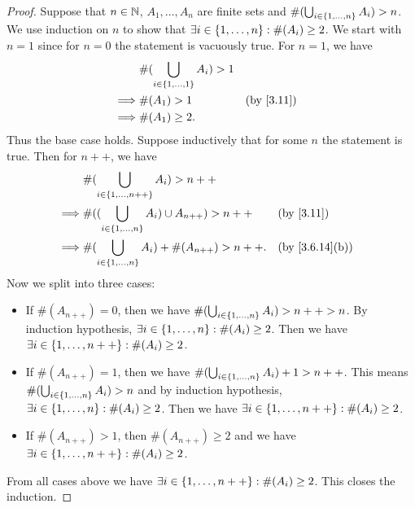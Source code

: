 \begin{proof}
	Suppose that \(n \in \mathbb{N}\), \(A_1, \dots, A_n\) are finite sets and \(\#(\bigcup_{i \in \left\lbrace1, \dots, n\right\rbrace} A_i) > n\).
	We use induction on \(n\) to show that \(\exists i \in \left\lbrace1, \dots, n\right\rbrace : \#(A_i) \geq 2\).
	We start with \(n = 1\) since for \(n = 0\) the statement is vacuously true.
	For \(n = 1\), we have
	\begin{align*}
		         & \#(\bigcup_{i \in \set{1, \dots, 1}} A_i) > 1                \\
		\implies & \#(A_1) > 1                                   &  & \by{3.11} \\
		\implies & \#(A_1) \geq 2.
	\end{align*}
	Thus the base case holds.
	Suppose inductively that for some \(n\) the statement is true.
	Then for \(n++\), we have
	\begin{align*}
		         & \#(\bigcup_{i \in \set{1, \dots, n++}} A_i) > n++                                                \\
		\implies & \#((\bigcup_{i \in \set{1, \dots, n}} A_i) \cup A_{n++}) > n++ &  & \by{3.11}                    \\
		\implies & \#(\bigcup_{i \in \set{1, \dots, n}} A_i) + \#(A_{n++}) > n++. &  & \text{(by \cref{3.6.14}(b))}
	\end{align*}
	Now we split into three cases:
	\begin{itemize}
		\item If \(\#(A_{n++}) = 0\), then we have \(\#(\bigcup_{i \in \left\lbrace1, \dots, n\right\rbrace} A_i) > n++ > n\).
		      By induction hypothesis, \(\exists i \in \left\lbrace1, \dots, n\right\rbrace : \#(A_i) \geq 2\).
		      Then we have \(\exists i \in \left\lbrace1, \dots, n++\right\rbrace : \#(A_i) \geq 2\).
		\item If \(\#(A_{n++}) = 1\), then we have \(\#(\bigcup_{i \in \left\lbrace1, \dots, n\right\rbrace} A_i) + 1 > n++\).
		      This means \(\#(\bigcup_{i \in \left\lbrace1, \dots, n\right\rbrace} A_i) > n\) and by induction hypothesis, \(\exists i \in \left\lbrace1, \dots, n\right\rbrace : \#(A_i) \geq 2\).
		      Then we have \(\exists i \in \left\lbrace1, \dots, n++\right\rbrace : \#(A_i) \geq 2\).
		\item If \(\#(A_{n++}) > 1\), then \(\#(A_{n++}) \geq 2\) and we have \(\exists i \in \left\lbrace1, \dots, n++\right\rbrace : \#(A_i) \geq 2\).
	\end{itemize}
	From all cases above we have \(\exists i \in \left\lbrace1, \dots, n++\right\rbrace : \#(A_i) \geq 2\).
	This closes the induction.
\end{proof}